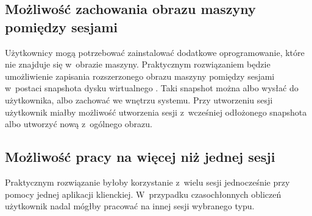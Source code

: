 \documentclass[../podsumowanie.tex]{subfiles}
\begin{document}
\subsection{Możliwość zachowania obrazu maszyny pomiędzy sesjami}
Użytkownicy mogą potrzebować zainstalować dodatkowe oprogramowanie, które nie znajduje się w~obrazie maszyny.
Praktycznym rozwiązaniem będzie umożliwienie zapisania rozszerzonego obrazu maszyny pomiędzy sesjami w~postaci snapshota dysku wirtualnego \parencite{libvirt-snapshot}.
Taki snapshot można albo wysłać do użytkownika, albo zachować we wnętrzu systemu.
Przy utworzeniu sesji użytkownik miałby możliwość utworzenia sesji z~wcześniej odłożonego snapshota albo utworzyć nową z~ogólnego obrazu.

\subsection{Możliwość pracy na więcej niż jednej sesji}
Praktycznym rozwiązanie byłoby korzystanie z~wielu sesji jednocześnie przy pomocy jednej aplikacji klienckiej.
W~przypadku czasochłonnych obliczeń użytkownik nadal mógłby pracować na innej sesji wybranego typu.
\end{document}
